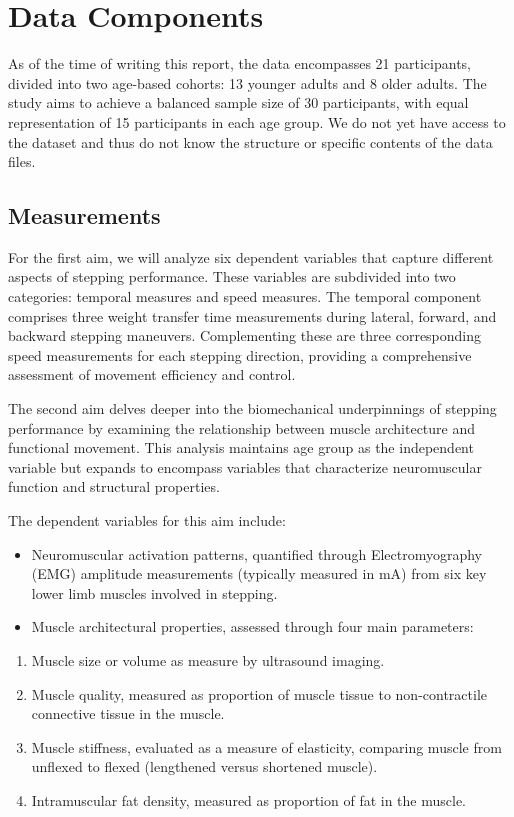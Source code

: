 \documentclass[
  letterpaper,
  DIV=11,
  numbers=noendperiod]{scrartcl}
\providecommand{\tightlist}{%
  \setlength{\itemsep}{0pt}\setlength{\parskip}{0pt}}\usepackage{longtable,booktabs,array}
\begin{document}
\section{Data Components}\label{data-components}

As of the time of writing this report, the data encompasses 21
participants, divided into two age-based cohorts: 13 younger adults and
8 older adults. The study aims to achieve a balanced sample size of 30
participants, with equal representation of 15 participants in each age
group. We do not yet have access to the dataset and thus do not know the
structure or specific contents of the data files.

\subsection{Measurements}\label{measurements}

For the first aim, we will analyze six dependent variables that capture
different aspects of stepping performance. These variables are
subdivided into two categories: temporal measures and speed measures.
The temporal component comprises three weight transfer time measurements
during lateral, forward, and backward stepping maneuvers. Complementing
these are three corresponding speed measurements for each stepping
direction, providing a comprehensive assessment of movement efficiency
and control.

The second aim delves deeper into the biomechanical underpinnings of
stepping performance by examining the relationship between muscle
architecture and functional movement. This analysis maintains age group
as the independent variable but expands to encompass variables that
characterize neuromuscular function and structural properties.

The dependent variables for this aim include:

\begin{itemize}
\item
  Neuromuscular activation patterns, quantified through Electromyography
  (EMG) amplitude measurements (typically measured in mA) from six key
  lower limb muscles involved in stepping.
\item
  Muscle architectural properties, assessed through four main
  parameters:
\end{itemize}

\begin{enumerate}
\def\labelenumi{\arabic{enumi}.}
\tightlist
\item
  Muscle size or volume as measure by ultrasound imaging.
\item
  Muscle quality, measured as proportion of muscle tissue to
  non-contractile connective tissue in the muscle.
\item
  Muscle stiffness, evaluated as a measure of elasticity, comparing
  muscle from unflexed to flexed (lengthened versus shortened muscle).
\item
  Intramuscular fat density, measured as proportion of fat in the
  muscle.
\end{enumerate}
\end{document}

